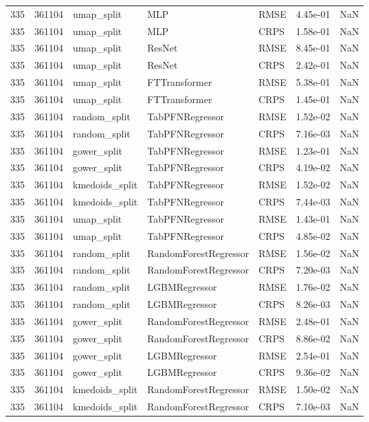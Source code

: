 \begin{tabular}{rrlllrr}
335 & 361104 & umap\_split & MLP & RMSE & 4.45e-01 & NaN \\
335 & 361104 & umap\_split & MLP & CRPS & 1.58e-01 & NaN \\
335 & 361104 & umap\_split & ResNet & RMSE & 8.45e-01 & NaN \\
335 & 361104 & umap\_split & ResNet & CRPS & 2.42e-01 & NaN \\
335 & 361104 & umap\_split & FTTransformer & RMSE & 5.38e-01 & NaN \\
335 & 361104 & umap\_split & FTTransformer & CRPS & 1.45e-01 & NaN \\
335 & 361104 & random\_split & TabPFNRegressor & RMSE & 1.52e-02 & NaN \\
335 & 361104 & random\_split & TabPFNRegressor & CRPS & 7.16e-03 & NaN \\
335 & 361104 & gower\_split & TabPFNRegressor & RMSE & 1.23e-01 & NaN \\
335 & 361104 & gower\_split & TabPFNRegressor & CRPS & 4.19e-02 & NaN \\
335 & 361104 & kmedoids\_split & TabPFNRegressor & RMSE & 1.52e-02 & NaN \\
335 & 361104 & kmedoids\_split & TabPFNRegressor & CRPS & 7.44e-03 & NaN \\
335 & 361104 & umap\_split & TabPFNRegressor & RMSE & 1.43e-01 & NaN \\
335 & 361104 & umap\_split & TabPFNRegressor & CRPS & 4.85e-02 & NaN \\
335 & 361104 & random\_split & RandomForestRegressor & RMSE & 1.56e-02 & NaN \\
335 & 361104 & random\_split & RandomForestRegressor & CRPS & 7.20e-03 & NaN \\
335 & 361104 & random\_split & LGBMRegressor & RMSE & 1.76e-02 & NaN \\
335 & 361104 & random\_split & LGBMRegressor & CRPS & 8.26e-03 & NaN \\
335 & 361104 & gower\_split & RandomForestRegressor & RMSE & 2.48e-01 & NaN \\
335 & 361104 & gower\_split & RandomForestRegressor & CRPS & 8.86e-02 & NaN \\
335 & 361104 & gower\_split & LGBMRegressor & RMSE & 2.54e-01 & NaN \\
335 & 361104 & gower\_split & LGBMRegressor & CRPS & 9.36e-02 & NaN \\
335 & 361104 & kmedoids\_split & RandomForestRegressor & RMSE & 1.50e-02 & NaN \\
335 & 361104 & kmedoids\_split & RandomForestRegressor & CRPS & 7.10e-03 & NaN \\

\end{tabular}

